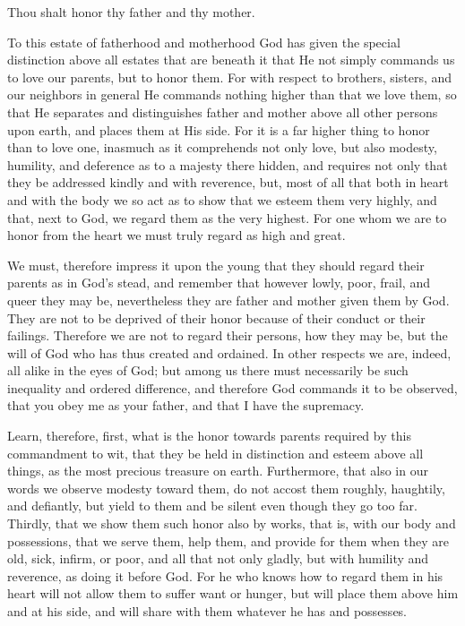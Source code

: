 Thou shalt honor thy father and thy mother.

To this estate of fatherhood and motherhood God has given the special
distinction above all estates that are beneath it that He not simply
commands us to love our parents, but to honor them. For with respect to
brothers, sisters, and our neighbors in general He commands nothing
higher than that we love them, so that He separates and distinguishes
father and mother above all other persons upon earth, and places them
at His side. For it is a far higher thing to honor than to love one,
inasmuch as it comprehends not only love, but also modesty, humility,
and deference as to a majesty there hidden, and requires not only that
they be addressed kindly and with reverence, but, most of all that both
in heart and with the body we so act as to show that we esteem them
very highly, and that, next to God, we regard them as the very highest.
For one whom we are to honor from the heart we must truly regard as
high and great.

We must, therefore impress it upon the young that they should regard
their parents as in God's stead, and remember that however lowly, poor,
frail, and queer they may be, nevertheless they are father and mother
given them by God. They are not to be deprived of their honor because
of their conduct or their failings. Therefore we are not to regard
their persons, how they may be, but the will of God who has thus
created and ordained. In other respects we are, indeed, all alike in
the eyes of God; but among us there must necessarily be such inequality
and ordered difference, and therefore God commands it to be observed,
that you obey me as your father, and that I have the supremacy.

Learn, therefore, first, what is the honor towards parents required by
this commandment to wit, that they be held in distinction and esteem
above all things, as the most precious treasure on earth. Furthermore,
that also in our words we observe modesty toward them, do not accost
them roughly, haughtily, and defiantly, but yield to them and be silent
even though they go too far. Thirdly, that we show them such honor also
by works, that is, with our body and possessions, that we serve them,
help them, and provide for them when they are old, sick, infirm, or
poor, and all that not only gladly, but with humility and reverence, as
doing it before God. For he who knows how to regard them in his heart
will not allow them to suffer want or hunger, but will place them above
him and at his side, and will share with them whatever he has and
possesses.

